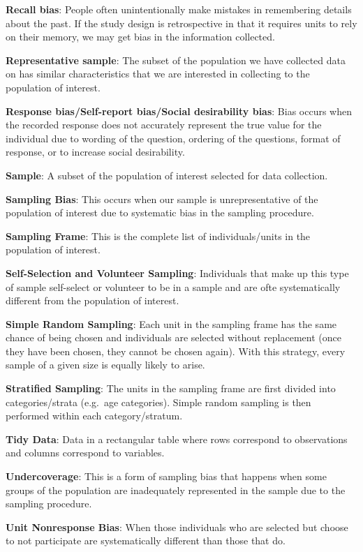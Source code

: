 \documentclass[
]{book}
\begin{document}
\textbf{Recall bias}: People often unintentionally make mistakes in remembering details about the past. If the study design is retrospective in that it requires units to rely on their memory, we may get bias in the information collected.

\textbf{Representative sample}: The subset of the population we have collected data on has similar characteristics that we are interested in collecting to the population of interest.

\textbf{Response bias/Self-report bias/Social desirability bias}: Bias occurs when the recorded response does not accurately represent the true value for the individual due to wording of the question, ordering of the questions, format of response, or to increase social desirability.

\textbf{Sample}: A subset of the population of interest selected for data collection.

\textbf{Sampling Bias}: This occurs when our sample is unrepresentative of the population of interest due to systematic bias in the sampling procedure.

\textbf{Sampling Frame}: This is the complete list of individuals/units in the population of interest.

\textbf{Self-Selection and Volunteer Sampling}: Individuals that make up this type of sample self-select or volunteer to be in a sample and are ofte systematically different from the population of interest.

\textbf{Simple Random Sampling}: Each unit in the sampling frame has the same chance of being chosen and individuals are selected without replacement (once they have been chosen, they cannot be chosen again). With this strategy, every sample of a given size is equally likely to arise.

\textbf{Stratified Sampling}: The units in the sampling frame are first divided into categories/strata (e.g.~age categories). Simple random sampling is then performed within each category/stratum.

\textbf{Tidy Data}: Data in a rectangular table where rows correspond to observations and columns correspond to variables.

\textbf{Undercoverage}: This is a form of sampling bias that happens when some groups of the population are inadequately represented in the sample due to the sampling procedure.

\textbf{Unit Nonresponse Bias}: When those individuals who are selected but choose to not participate are systematically different than those that do.
\end{document}
